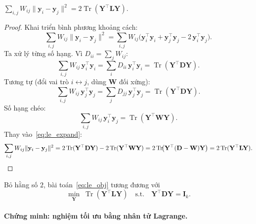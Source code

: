 \begin{lemma}\label{lem:le_trace}
$\displaystyle\sum_{i,j}W_{ij}\|\mathbf{y}_i-\mathbf{y}_j\|^2
 = 2\operatorname{Tr}(\mathbf{Y}^\top\mathbf{L}\mathbf{Y})$.
\end{lemma}
\begin{proof}
Khai triển bình phương khoảng cách:
\begin{equation}\label{eq:le_expand}
  \sum_{i,j}W_{ij}\|\mathbf{y}_i - \mathbf{y}_j\|^2
  = \sum_{i,j}W_{ij}\bigl(\mathbf{y}_i^\top\mathbf{y}_i
    + \mathbf{y}_j^\top\mathbf{y}_j
    - 2\,\mathbf{y}_i^\top\mathbf{y}_j\bigr).
\end{equation}
Ta xử lý từng số hạng. Vì $D_{ii}=\sum_j W_{ij}$:
\begin{equation*}
  \sum_{i,j}W_{ij}\,\mathbf{y}_i^\top\mathbf{y}_i
  = \sum_i D_{ii}\,\mathbf{y}_i^\top\mathbf{y}_i
  = \operatorname{Tr}(\mathbf{Y}^\top\mathbf{D}\mathbf{Y}).
\end{equation*}
Tương tự (đổi vai trò $i\leftrightarrow j$, dùng $\mathbf{W}$ đối xứng):
\begin{equation*}
  \sum_{i,j}W_{ij}\,\mathbf{y}_j^\top\mathbf{y}_j
  = \sum_j D_{jj}\,\mathbf{y}_j^\top\mathbf{y}_j
  = \operatorname{Tr}(\mathbf{Y}^\top\mathbf{D}\mathbf{Y}).
\end{equation*}
Số hạng chéo:
\begin{equation*}
  \sum_{i,j}W_{ij}\,\mathbf{y}_i^\top\mathbf{y}_j
  = \operatorname{Tr}(\mathbf{Y}^\top\mathbf{W}\mathbf{Y}).
\end{equation*}
Thay vào~\eqref{eq:le_expand}:
\begin{equation*}
  \sum_{i,j}W_{ij}\|\mathbf{y}_i-\mathbf{y}_j\|^2
  = 2\operatorname{Tr}(\mathbf{Y}^\top\mathbf{D}\mathbf{Y})
    - 2\operatorname{Tr}(\mathbf{Y}^\top\mathbf{W}\mathbf{Y})
  = 2\operatorname{Tr}\!\bigl(\mathbf{Y}^\top(\mathbf{D}-\mathbf{W})\mathbf{Y}\bigr)
  = 2\operatorname{Tr}(\mathbf{Y}^\top\mathbf{L}\mathbf{Y}). \qedhere
\end{equation*}
\end{proof}
 
Bỏ hằng số $2$, bài toán~\eqref{eq:le_obj} tương đương với
\begin{equation}\label{eq:le_trace}
  \min_{\mathbf{Y}}\;\operatorname{Tr}(\mathbf{Y}^\top\mathbf{L}\mathbf{Y})
  \quad\text{s.t.}\quad
  \mathbf{Y}^\top\mathbf{D}\mathbf{Y}=\mathbf{I}_k.
\end{equation}
 
\paragraph{Chứng minh: nghiệm tối ưu bằng nhân tử Lagrange.}
 
